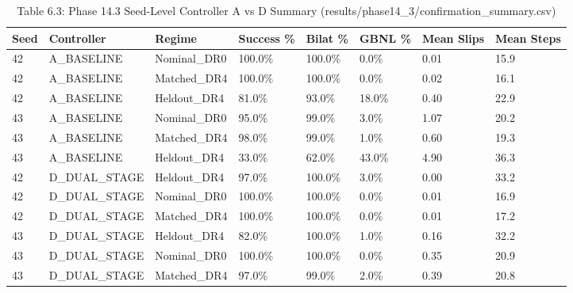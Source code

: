 \documentclass[11pt,a4paper,oneside]{book}
\begin{document}
\begin{longtable}{l l l l l l l l}\caption{Table 6.3: Phase 14.3 Seed-Level Controller A vs D Summary (results/phase14\_3/confirmation\_summary.csv)}\\\toprule
Seed & Controller & Regime & Success \% & Bilat \% & GBNL \% & Mean Slips & Mean Steps \\ \midrule \endhead
42 & A\_BASELINE & Nominal\_DR0 & 100.0\% & 100.0\% & 0.0\% & 0.01 & 15.9 \\
42 & A\_BASELINE & Matched\_DR4 & 100.0\% & 100.0\% & 0.0\% & 0.02 & 16.1 \\
42 & A\_BASELINE & Heldout\_DR4 & 81.0\% & 93.0\% & 18.0\% & 0.40 & 22.9 \\
43 & A\_BASELINE & Nominal\_DR0 & 95.0\% & 99.0\% & 3.0\% & 1.07 & 20.2 \\
43 & A\_BASELINE & Matched\_DR4 & 98.0\% & 99.0\% & 1.0\% & 0.60 & 19.3 \\
43 & A\_BASELINE & Heldout\_DR4 & 33.0\% & 62.0\% & 43.0\% & 4.90 & 36.3 \\
42 & D\_DUAL\_STAGE & Heldout\_DR4 & 97.0\% & 100.0\% & 3.0\% & 0.00 & 33.2 \\
42 & D\_DUAL\_STAGE & Nominal\_DR0 & 100.0\% & 100.0\% & 0.0\% & 0.01 & 16.9 \\
42 & D\_DUAL\_STAGE & Matched\_DR4 & 100.0\% & 100.0\% & 0.0\% & 0.01 & 17.2 \\
43 & D\_DUAL\_STAGE & Heldout\_DR4 & 82.0\% & 100.0\% & 1.0\% & 0.16 & 32.2 \\
43 & D\_DUAL\_STAGE & Nominal\_DR0 & 100.0\% & 100.0\% & 0.0\% & 0.35 & 20.9 \\
43 & D\_DUAL\_STAGE & Matched\_DR4 & 97.0\% & 99.0\% & 2.0\% & 0.39 & 20.8 \\
\bottomrule \end{longtable}
\end{document}
